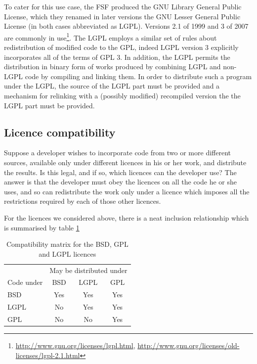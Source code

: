 \documentclass[a4paper,12pt]{article}
\begin{document}
To cater for this use case, the FSF produced the GNU Library General Public
License, which they renamed in later versions the GNU Lesser General Public
License (in both cases abbreviated as LGPL). Versions 2.1 of 1999 and 3 of
2007 are commonly in
use\footnote{\url{http://www.gnu.org/licenses/lgpl.html},
  \url{http://www.gnu.org/licenses/old-licenses/lgpl-2.1.html}}. The LGPL
employs a similar set of rules about redistribution of modified code to the
GPL, indeed LGPL version 3 explicitly incorporates all of the terms of GPL
3. In addition, the LGPL permits the distribution in binary form of works
produced by combining LGPL and non-LGPL code by compiling and linking
them. In order to distribute such a program under the LGPL, the source of
the LGPL part must be provided and a mechanism for relinking with a
(possibly modified) recompiled version the the LGPL part must be provided.

\subsection{Licence compatibility}

Suppose a developer wishes to incorporate code from two or more different
sources, available only under different licences in his or her work, and
distribute the results. Is this legal, and if so, which licences can the
developer use? The answer is that the developer must obey the licences on
all the code he or she uses, and so can redistribute the work only under a
licence which imposes all the restrictions required by each of those other
licences. 

For the licences we considered above, there is a neat inclusion
relationship which is summarised by table \ref{tab:compatibility}

\begin{table}[ht]
  \centering
  \begin{tabular}{l|ccc}
     & \multicolumn{3}{c}{May be distributed under}\\
    Code under & BSD & LGPL & GPL\\
    \hline
    BSD & Yes & Yes & Yes\\
    LGPL & No & Yes & Yes\\
    GPL & No & No & Yes
  \end{tabular}
  \caption{Compatibility matrix for the BSD, GPL and LGPL licences}
  \label{tab:compatibility}
\end{table}
\end{document}
